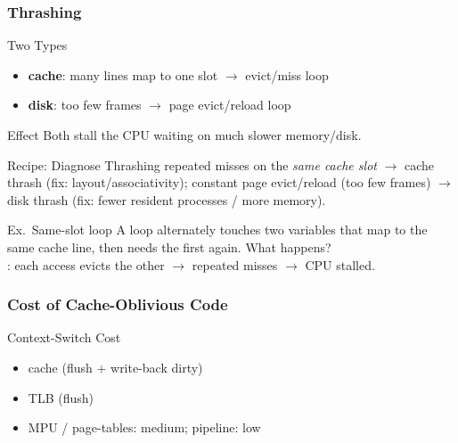 \multend

\subsubsection{Thrashing}

\begin{minipage}{0.65\linewidth}

\begin{definition}{Two Types}
    \begin{itemize}
        \item \textbf{cache}: many lines map to one slot $\to$ evict/miss loop
        \item \textbf{disk}: too few frames $\to$ page evict/reload loop
    \end{itemize}
\end{definition}
\end{minipage}
    \begin{minipage}{0.34\linewidth}

\begin{concept}{Effect}
    Both stall the CPU waiting on much slower memory/disk.
\end{concept}

\end{minipage}

\begin{KR}{Recipe: Diagnose Thrashing}
    repeated misses on the \emph{same cache slot} $\to$ cache thrash (fix: layout/associativity); constant page evict/reload (too few frames) $\to$ disk thrash (fix: fewer resident processes / more memory).
\end{KR}

\begin{example2}{Ex.\ Same-slot loop}
    A loop alternately touches two variables that map to the same cache line, then needs the first again. What happens?
     \\ 
    : each access evicts the other $\to$ repeated misses $\to$ CPU stalled.
\end{example2}

\subsubsection{Cost of Cache-Oblivious Code}


\begin{concept}{Context-Switch Cost}
    \begin{itemize}
        \item cache  (flush + write-back dirty)
        \item TLB  (flush)
        \item MPU / page-tables: medium; pipeline: low
    \end{itemize}
\end{concept}

